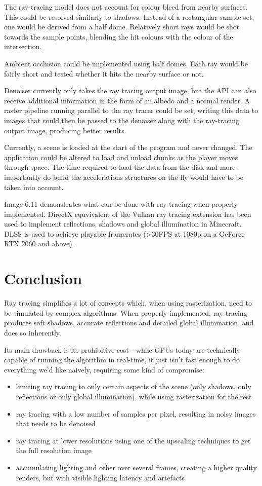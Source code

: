 \documentclass[times, utf8, zavrsni, numeric]{fer}
\begin{document}
The ray-tracing model does not account for colour bleed from nearby surfaces. This could be resolved similarly to shadows. Instead of a rectangular sample set, one would be derived from a half dome. Relatively short rays would be shot towards the sample points, blending the hit colours with the colour of the intersection.

Ambient occlusion could be implemented using half domes. Each ray would be fairly short and tested whether it hits the nearby surface or not.

Denoiser currently only takes the ray tracing output image, but the API can also receive additional information in the form of an albedo and a normal render. A raster pipeline running parallel to the ray tracer could be set, writing this data to images that could then be passed to the denoiser along with the ray-tracing output image, producing better results.

Currently, a scene is loaded at the start of the program and never changed. The application could be altered to load and unload chunks as the player moves through space. The time required to load the data from the disk and more importantly do build the accelerations structures on the fly would have to be taken into account.

Image 6.11 demonstrates what can be done with ray tracing when properly implemented. DirectX equvivalent of the Vulkan ray tracing extension has been used to implement reflections, shadows and global illumination in Minecraft. DLSS is used to achieve playable framerates (>30FPS at 1080p on a GeForce RTX 2060 and above).


\chapter{Conclusion}
Ray tracing simplifies a lot of concepts which, when using rasterization, need to be simulated by complex algorithms. When properly implemented, ray tracing produces soft shadows, accurate reflections and detailed global illumination, and does so inherently.

Its main drawback is its prohibitive cost - while GPUs today are technically capable of running the algorithm in real-time, it just isn't fast enough to do everything we'd like naively, requiring some kind of compromise:
\begin{itemize}
\item limiting ray tracing to only certain aspects of the scene (only shadows, only reflections or only global illumination), while using rasterization for the rest
\item ray tracing with a low number of samples per pixel, resulting in noisy images that needs to be denoised
\item ray tracing at lower resolutions using one of the upscaling techniques to get the full resolution image
\item accumulating lighting and other over several frames, creating a higher quality renders, but with visible lighting latency and artefacts
\end{itemize}
\end{document}

